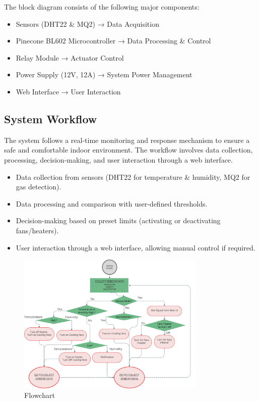 \documentclass[a4paper]{scrartcl}
\begin{document}
The block diagram consists of the following major components:
\begin{itemize}
    \item Sensors (DHT22 \& MQ2) → Data Acquisition
    \item Pinecone BL602 Microcontroller → Data Processing \& Control
    \item Relay Module → Actuator Control
    \item Power Supply (12V, 12A) → System Power Management
    \item Web Interface → User Interaction
\end{itemize}

\subsection{System Workflow}
The system follows a real-time monitoring and response mechanism to ensure a safe and comfortable indoor environment. The workflow involves data collection, processing, decision-making, and user interaction through a web interface.

\begin{itemize}
    \item Data collection from sensors (DHT22 for temperature \& humidity, MQ2 for gas detection).
    \item Data processing and comparison with user-defined thresholds.
    \item Decision-making based on preset limits (activating or deactivating fans/heaters).
    \item User interaction through a web interface, allowing manual control if required.
\end{itemize}

\begin{figure}[H]
    \centering
    \includegraphics[width=0.8\textwidth]{images/FC.png}
    \caption{Flowchart}
\end{figure}
\end{document}
